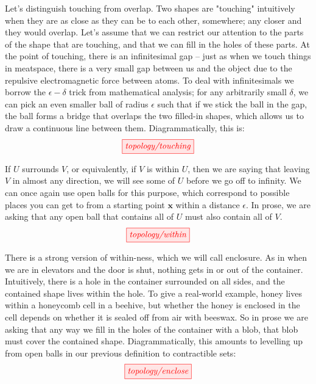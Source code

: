 \begin{myboxR}
\begin{defn}\label{defn:touching}
Let's distinguish touching from overlap. Two shapes are "touching" intuitively when they are as close as they can be to each other, somewhere; any closer and they would overlap. Let's assume that we can restrict our attention to the parts of the shape that are touching, and that we can fill in the holes of these parts. At the point of touching, there is an infinitesimal gap -- just as when we touch things in meatspace, there is a very small gap between us and the object due to the repulsive electromagnetic force between atoms. To deal with infinitesimals we borrow the $\epsilon-\delta$ trick from mathematical analysis; for any arbitrarily small $\delta$, we can pick an even smaller ball of radius $\epsilon$ such that if we stick the ball in the gap, the ball forms a bridge that overlaps the two filled-in shapes, which allows us to draw a continuous line between them. Diagrammatically, this is: 
\[\tikzfig{topology/touching}\]
\end{defn}
\end{myboxR}

\begin{myboxB}
\begin{defn}\label{defn:within}
If $U$ surrounds $V$, or equivalently, if $V$ is within $U$, then we are saying that leaving $V$ in almost any direction, we will see some of $U$ before we go off to infinity. We can once again use open balls for this purpose, which correspond to possible places you can get to from a starting point $\mathbf{x}$ within a distance $\epsilon$. In prose, we are asking that any open ball that contains all of $U$ must also contain all of $V$.
\[\tikzfig{topology/within}\]
\end{defn}
\end{myboxB}

\begin{myboxR}
\begin{defn}\label{defn:containment}
There is a strong version of within-ness, which we will call enclosure. As in when we are in elevators and the door is shut, nothing gets in or out of the container. Intuitively, there is a hole in the container surrounded on all sides, and the contained shape lives within the hole. To give a real-world example, honey lives within a honeycomb cell in a beehive, but whether the honey is enclosed in the cell depends on whether it is sealed off from air with beeswax. So in prose we are asking that any way we fill in the holes of the container with a blob, that blob must cover the contained shape. Diagrammatically, this amounts to levelling up from open balls in our previous definition to contractible sets:
\[\tikzfig{topology/enclose}\]
\end{defn}
\end{myboxR}


